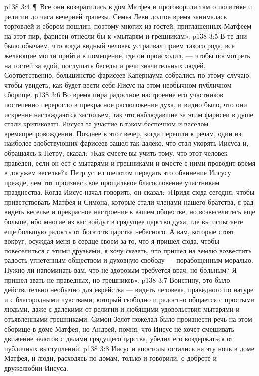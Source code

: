 \vs p138 3:4 \P\ Все они возвратились в дом Матфея и проговорили там о политике и религии до часа вечерней трапезы. Семья Леви долгое время занималась торговлей и сбором пошлин, поэтому многих из гостей, приглашенных Матфеем на этот пир, фарисеи отнесли бы к «мытарям и грешникам».
\vs p138 3:5 В те дни было обычаем, что когда видный человек устраивал прием такого рода, все желающие могли прийти в помещение, где он происходил, --- чтобы посмотреть на гостей за едой, послушать беседы и речи значительных людей. Соответственно, большинство фарисеев Капернаума собрались по этому случаю, чтобы увидеть, как будет вести себя Иисус на этом необычном публичном сборище.
\vs p138 3:6 Во время пира радостное настроение его участников постепенно переросло в прекрасное расположение духа, и видно было, что они искренне наслаждаются застольем, так что наблюдавшие за этим фарисеи в душе стали критиковать Иисуса за участие в таком беспечном и веселом времяпрепровождении. Позднее в этот вечер, когда перешли к речам, один из наиболее злобствующих фарисеев зашел так далеко, что стал укорять Иисуса и, обращаясь к Петру, сказал: «Как смеете вы учить тому, что этот человек праведен, если он ест с мытарями и грешниками и вместе с ними проводит время в досужем веселье?» Петр успел шепотом передать это обвинение Иисусу прежде, чем тот произнес свое прощальное благословение участникам празднества. Когда Иисус начал говорить, он сказал: «Придя сюда сегодня, чтобы приветствовать Матфея и Симона, которые стали членами нашего братства, я рад видеть веселье и прекрасное настроение в вашем обществе, но возвеселитесь еще больше, ибо многие из вас войдут в грядущее царство духа, где вы испытаете еще большую радость от богатств царства небесного. А вам, которые стоят вокруг, осуждая меня в сердце своем за то, что я пришел сюда, чтобы повеселиться с этими друзьями, я хочу сказать, что пришел на землю возвестить радость угнетенным обществом и духовную свободу --- порабощенным моралью. Нужно ли напоминать вам, что не здоровым требуется врач, но больным? Я пришел звать не праведных, но грешников».
\vs p138 3:7 Воистину, это было действительно необычно для еврейства --- видеть человека, праведного по натуре и с благородными чувствами, который свободно и радостно общается с простыми людьми, даже с далекими от религии и любящими удовольствия мытарями и отъявленными грешниками. Симон Зелот пожелал было произнести речь на этом сборище в доме Матфея, но Андрей, помня, что Иисус не хочет смешивать движение зелотов с делами грядущего царства, убедил его воздержаться от публичных выступлений.
\vs p138 3:8 Иисус и апостолы остались на эту ночь в доме Матфея, и люди, расходясь по домам, только и говорили, о доброте и дружелюбии Иисуса.
